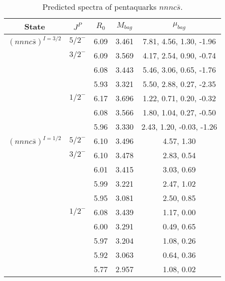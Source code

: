 \documentclass[prd,twocolumn,floatfix,nofootinbib]{revtex4}
\begin{document}
\renewcommand{\tabcolsep}{0.5cm}
\renewcommand{\arraystretch}{1.2}
\begin{table*}[!htbp]
    \caption{Predicted spectra of pentaquarks $nnnc\bar{s}$.}
    \begin{tabular}{ccccc}
        \hline\hline
        {\rm State} &$J^{P}$ &$R_{0}$ &$M_{bag}$ &$\mu_{bag}$ \\ \hline
        ${(nnnc\bar{s})}^{I=3/2}$
            &${5/2}^{-}$    &6.09   &3.461  &7.81, 4.56, 1.30, -1.96 \\
            &${3/2}^{-}$    &6.09   &3.569  &4.17, 2.54, 0.90, -0.74 \\
            &               &6.08   &3.443  &5.46, 3.06, 0.65, -1.76 \\
            &               &5.93   &3.321  &5.50, 2.88, 0.27, -2.35 \\
            &${1/2}^{-}$    &6.17   &3.696  &1.22, 0.71, 0.20, -0.32 \\
            &               &6.08   &3.566  &1.80, 1.04, 0.27, -0.50 \\
            &               &5.96   &3.330  &2.43, 1.20, -0.03, -1.26 \\
        ${(nnnc\bar{s})}^{I=1/2}$
            &${5/2}^{-}$    &6.10   &3.496  &4.57, 1.30 \\
            &${3/2}^{-}$    &6.10   &3.478  &2.83, 0.54 \\
            &               &6.01   &3.415  &3.03, 0.69 \\
            &               &5.99   &3.221  &2.47, 1.02 \\
            &               &5.95   &3.081  &2.50, 0.85 \\
            &${1/2}^{-}$    &6.08   &3.439  &1.17, 0.00 \\
            &               &6.00   &3.291  &0.49, 0.65 \\
            &               &5.97   &3.204  &1.08, 0.26 \\
            &               &5.92   &3.063  &0.64, 0.36 \\
            &               &5.77   &2.957  &1.08, 0.02 \\
        \hline\hline
    \end{tabular}
\end{table*}
\end{document}
